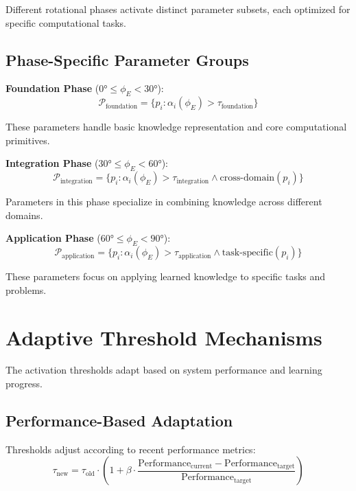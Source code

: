Different rotational phases activate distinct parameter subsets, each optimized for specific computational tasks.

\subsection{Phase-Specific Parameter Groups}

\textbf{Foundation Phase} ($0° \leq \phi_E < 30°$):
\begin{equation}
\mathcal{P}_{\text{foundation}} = \{p_i : \alpha_i(\phi_E) > \tau_{\text{foundation}}\}
\end{equation}

These parameters handle basic knowledge representation and core computational primitives.

\textbf{Integration Phase} ($30° \leq \phi_E < 60°$):
\begin{equation}
\mathcal{P}_{\text{integration}} = \{p_i : \alpha_i(\phi_E) > \tau_{\text{integration}} \land \text{cross-domain}(p_i)\}
\end{equation}

Parameters in this phase specialize in combining knowledge across different domains.

\textbf{Application Phase} ($60° \leq \phi_E < 90°$):
\begin{equation}
\mathcal{P}_{\text{application}} = \{p_i : \alpha_i(\phi_E) > \tau_{\text{application}} \land \text{task-specific}(p_i)\}
\end{equation}

These parameters focus on applying learned knowledge to specific tasks and problems.

\section{Adaptive Threshold Mechanisms}

The activation thresholds adapt based on system performance and learning progress.

\subsection{Performance-Based Adaptation}

Thresholds adjust according to recent performance metrics:
\begin{equation}
\tau_{\text{new}} = \tau_{\text{old}} \cdot \left(1 + \beta \cdot \frac{\text{Performance}_{\text{current}} - \text{Performance}_{\text{target}}}{\text{Performance}_{\text{target}}}\right)
\end{equation}

